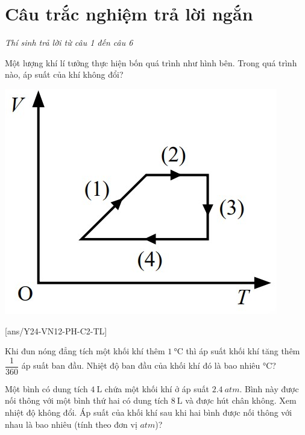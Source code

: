 \section{Câu trắc nghiệm trả lời ngắn} \textit{Thí sinh trả lời từ câu 1 đến câu 6}
\setcounter{ex}{0}
\begin{ex}
	Một lượng khí lí tưởng thực hiện bốn quá trình như hình bên.
	Trong quá trình nào, áp suất của khí không đổi?
\begin{center}
	\includegraphics[width=0.25\linewidth]{../figs/G12C2-9}
\end{center}
	
	\loigiai{
		
	}
\end{ex}
[ans/Y24-VN12-PH-C2-TL]
\begin{ex}
	Khi đun nóng đẳng tích một khối khí thêm $\SI{1}{\celsius}$ thì áp suất khối khí tăng thêm $\dfrac{1}{360}$	áp suất ban đầu. Nhiệt độ ban đầu của khối khí đó là bao nhiêu $\si{\celsius}$?
\end{ex}
\begin{ex}
	Một bình có dung tích $\SI{4}{\liter}$ chứa một khối khí ở áp suất $\SI{2.4}{atm}$. Bình này được nối thông với một bình thứ hai có dung tích $\SI{8}{\liter}$ và được hút chân không. Xem nhiệt độ không đổi. Áp suất của khối khí sau khi hai bình được nối thông với nhau là bao nhiêu (tính theo đơn vị $\si{atm}$)?
\end{ex}
